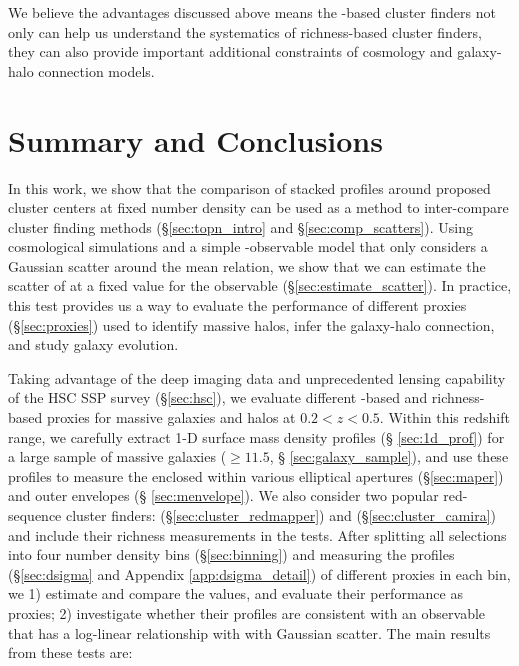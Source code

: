 \documentclass[fleqn,usenatbib,useAMS,english]{mnras}
\begin{document}
    We believe the advantages discussed above means the \mstar{}-based cluster finders
    not only can help us understand the systematics of richness-based cluster finders,
    they can also provide important additional constraints of cosmology and 
    galaxy-halo connection models.


\section{Summary and Conclusions}
    \label{sec:summary}

    In this work, we show that the comparison of stacked \dsigma{} profiles around proposed
    cluster centers at fixed number density can be used as a method to inter-compare cluster
    finding methods (\S \ref{sec:topn_intro} and \S \ref{sec:comp_scatters}).
    Using cosmological simulations and a simple \mvir{}-observable model that only
    considers a Gaussian scatter around the mean relation, we show that we can estimate the
    scatter of \mvir{} at a fixed value for the observable (\S \ref{sec:estimate_scatter}).
    In practice, this \topn{} test provides us a way to evaluate the performance of different
    \mvir{} proxies (\S \ref{sec:proxies}) used to identify massive halos, infer the
    galaxy-halo connection, and study galaxy evolution.

    Taking advantage of the deep imaging data and unprecedented lensing capability of the HSC
    SSP survey (\S \ref{sec:hsc}), we evaluate different \mstar{}-based and richness-based
    \mvir{} proxies for massive galaxies and halos at $0.2 < z < 0.5$.
    Within this redshift range, we carefully extract 1-D surface mass density profiles (\S
    \ref{sec:1d_prof}) for a large sample of massive galaxies ($\geq 11.5$, \S
    \ref{sec:galaxy_sample}), and use these profiles to measure the \mstar{} enclosed within
    various elliptical apertures (\S \ref{sec:maper}) and outer envelopes (\S
    \ref{sec:menvelope}).
    We also consider two popular red-sequence cluster finders: \redm{}
    (\S \ref{sec:cluster_redmapper}) and \camira{} (\S \ref{sec:cluster_camira}) and include
    their richness measurements in the \topn{} tests.
    After splitting all selections into four number density bins (\S \ref{sec:binning}) and
    measuring the \dsigma{} profiles (\S \ref{sec:dsigma} and Appendix \ref{app:dsigma_detail})
    of different proxies in each bin, we
    1) estimate and compare the \sigmvir{} values, and evaluate their performance as \mvir{}
    proxies;
    2) investigate whether their \dsigma{} profiles are consistent with an observable that has
    a log-linear relationship with \mvir{} with Gaussian scatter.
    The main results from these tests are:
\end{document}
